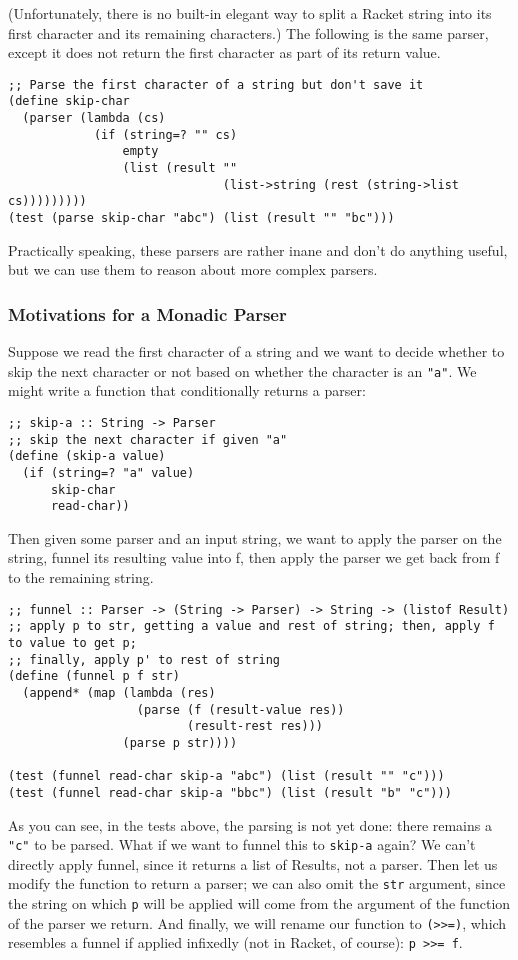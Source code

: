 (Unfortunately, there is no built-in elegant way to split a Racket string into its first character and its remaining characters.) The following is the same parser, except it does not return the first character as part of its return value.
\begin{verbatim}
;; Parse the first character of a string but don't save it
(define skip-char
  (parser (lambda (cs)
            (if (string=? "" cs)
                empty
                (list (result ""
                              (list->string (rest (string->list cs)))))))))
(test (parse skip-char "abc") (list (result "" "bc")))
\end{verbatim}
Practically speaking, these parsers are rather inane and don't do anything useful, but we can use them to reason about more complex parsers.

\subsubsection{Motivations for a Monadic Parser}
Suppose we read the first character of a string and we want to decide whether to skip the next character or not based on whether the character is an \texttt{"a"}. We might write a function that conditionally returns a parser:
\begin{verbatim}
;; skip-a :: String -> Parser
;; skip the next character if given "a"
(define (skip-a value)
  (if (string=? "a" value)
      skip-char
      read-char))
\end{verbatim}
Then given some parser and an input string, we want to apply the parser on the string, funnel its resulting value into f, then apply the parser we get back from f to the remaining string.
\begin{verbatim}
;; funnel :: Parser -> (String -> Parser) -> String -> (listof Result)
;; apply p to str, getting a value and rest of string; then, apply f to value to get p;
;; finally, apply p' to rest of string
(define (funnel p f str)
  (append* (map (lambda (res)
                  (parse (f (result-value res))
                         (result-rest res)))
                (parse p str))))
                
(test (funnel read-char skip-a "abc") (list (result "" "c")))
(test (funnel read-char skip-a "bbc") (list (result "b" "c")))
\end{verbatim}
As you can see, in the tests above, the parsing is not yet done: there remains a \texttt{"c"} to be parsed. What if we want to funnel this to \texttt{skip-a} again? We can't directly apply funnel, since it returns a list of Results, not a parser. Then let us modify the function to return a parser; we can also omit the \texttt{str} argument, since the string on which \texttt{p} will be applied will come from the argument of the function of the parser we return. And finally, we will rename our function to \texttt{(>>=)}, which resembles a funnel if applied infixedly (not in Racket, of course): \texttt{p >>= f}.
